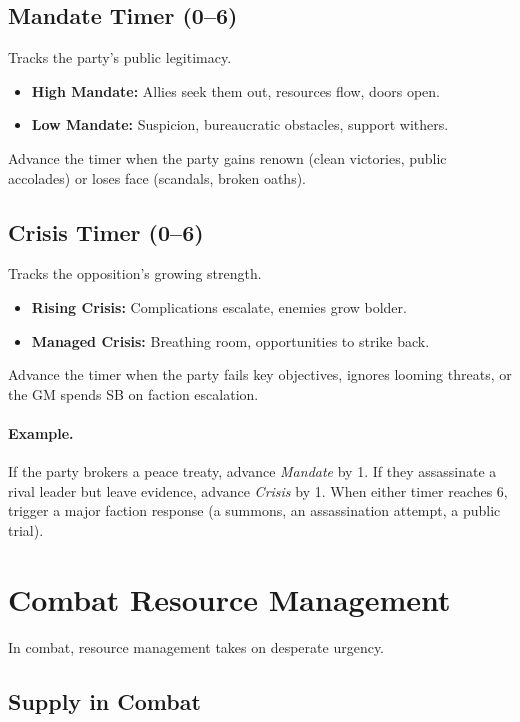 \subsection{Mandate Timer (0--6)}
\label{subsec:mandate}

Tracks the party's public legitimacy.
\begin{itemize}
  \item \textbf{High Mandate:} Allies seek them out, resources flow, doors open.
  \item \textbf{Low Mandate:} Suspicion, bureaucratic obstacles, support withers.
\end{itemize}
Advance the timer when the party gains renown (clean victories, public accolades) or loses face (scandals, broken oaths).

\subsection{Crisis Timer (0--6)}
\label{subsec:crisis}

Tracks the opposition's growing strength.
\begin{itemize}
  \item \textbf{Rising Crisis:} Complications escalate, enemies grow bolder.
  \item \textbf{Managed Crisis:} Breathing room, opportunities to strike back.
\end{itemize}
Advance the timer when the party fails key objectives, ignores looming threats, or the GM spends SB on faction escalation.

\paragraph{Example.}
If the party brokers a peace treaty, advance \textit{Mandate} by 1. If they assassinate a rival leader but leave evidence, advance \textit{Crisis} by 1. When either timer reaches 6, trigger a major faction response (a summons, an assassination attempt, a public trial).

\section{Combat Resource Management}
\label{sec:combat-resources}

In combat, resource management takes on desperate urgency.

\subsection{Supply in Combat}
\label{subsec:combat-supply}

